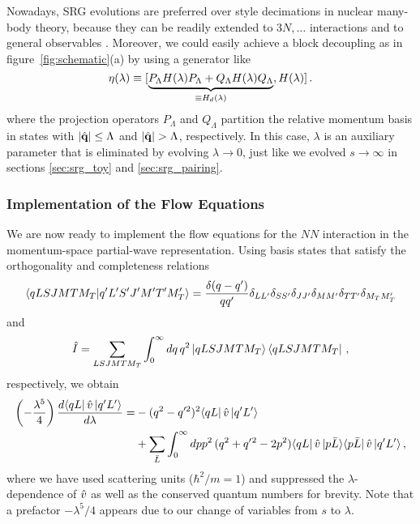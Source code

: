 {Nowadays, SRG evolutions are 
preferred over \Vlowk{} style decimations in nuclear many-body theory, because 
they can be readily extended to $3N,\ldots$ interactions and to general 
observables 
\cite{Bogner:2010pq,Anderson:2010br,Schuster:2014oq,More:2015bx,Jurgenson:2009bs,Hebeler:2012ly,Wendt:2013ys}. 
Moreover, we could easily achieve a block decoupling as in 
figure~\ref{fig:schematic}(a) by using a generator like \cite{Anderson:2008hx}
\begin{equation}\label{eq:def_srg_generator_PQ}
  \eta(\lambda) \equiv \comm{\underbrace{P_{\Lambda}H(\lambda)P_{\Lambda}+Q_{\Lambda}H(\lambda)Q_{\Lambda}}_{\equiv H_d(\lambda)}}{H(\lambda)}\,.
\end{equation}
where the projection operators $P_\Lambda$ and $Q_\Lambda$ partition the
relative momentum basis in states with $|\hat{\mathbf{q}}|\leq\Lambda$ and $|\qOV|>\Lambda$,
respectively. In this case, $\lambda$ is an auxiliary parameter that is eliminated
by evolving $\lambda\to0$, just like we evolved $s\to\infty$ in sections \ref{sec:srg_toy}
and \ref{sec:srg_pairing}. 

%
%
\subsubsection{\label{sec:srg_nn_flow}Implementation of the Flow Equations}
We are now ready to implement the flow equations for the $NN$ interaction in
the momentum-space partial-wave representation. Using basis states that 
satisfy the orthogonality and completeness relations
\begin{equation}
  \langle{qLSJMTM_T}|{q'L'S'J'M'T'M'_T}\rangle = 
    \frac{\delta(q-q')}{qq'}\delta_{LL'}\delta_{SS'}\delta_{JJ'}\delta_{MM'}\delta_{TT'}\delta_{M_TM'_T}
\end{equation}
and
\begin{equation}
  \hat{I} = \sum_{LSJMTM_T}\int_0^\infty dq\,q^2 \,|{qLSJMTM_T}\rangle\bra{qLSJMTM_T}\,,
\end{equation}
respectively, we obtain \cite{Bogner:2007od,Bogner:2010pq}
\begin{align}
  \left(-\frac{\lambda^5}{4}\right)\frac{d\matrixe{qL}{\vO}{q'L'}}{d\lambda} =&- (q^2 - q'^{2})^2
  \matrixe{qL}{\vO}{q'L'}
  \notag\\
    &+ \sum_{\bar{L}}\int_0^{\infty}dp p^2\,
      (q^2 + q'{}^2 - 2p^2)\matrixe{qL}{\vO}{p\bar{L}}
      \matrixe{p\bar{L}}{\vO}{q'L'}\,,\label{eq:flow_nn}
\end{align}
where we have used scattering units ($\hbar^2/m=1$) and suppressed
the $\lambda$-dependence of $\hat{v}$ as well as the conserved quantum 
numbers for brevity. Note that a prefactor $-\lambda^5/4$ 
appears due to our change of variables from $s$ to $\lambda$. 

}
